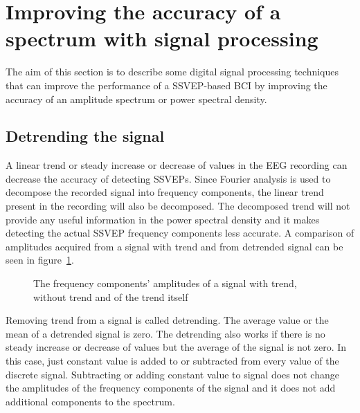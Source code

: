 
\section{Improving the accuracy of a spectrum with signal processing}

The aim of this section is to describe some digital signal processing techniques that can improve the performance of a \gls{SSVEP}-based \gls{BCI} by improving the accuracy of an amplitude spectrum or \gls{power spectral density}.

\subsection{Detrending the signal}

A linear trend or steady increase or decrease of values in the \gls{EEG} recording can decrease the accuracy of detecting \glspl{SSVEP}. Since Fourier analysis is used to decompose the recorded signal into \glspl{frequency component}, the linear trend present in the recording will also be decomposed. The decomposed trend will not provide any useful information in the \gls{power spectral density} and it makes detecting the actual \gls{SSVEP} \glspl{frequency component} less accurate. A comparison of amplitudes acquired from a signal with trend and from detrended signal can be seen in figure~\ref{fig:detrend}.

\begin{figure}[h!]
	
	\caption{The frequency components' amplitudes of a signal with trend, without trend and of the trend itself}
	\label{fig:detrend}
\end{figure}

Removing trend from a signal is called detrending. The average value or the mean of a detrended signal is zero. The detrending also works if there is no steady increase or decrease of values but the average of the signal is not zero. In this case, just constant value is added to or subtracted from every value of the discrete signal. Subtracting or adding constant value to signal does not change the amplitudes of the \glspl{frequency component} of the signal and it does not add additional components to the spectrum.

